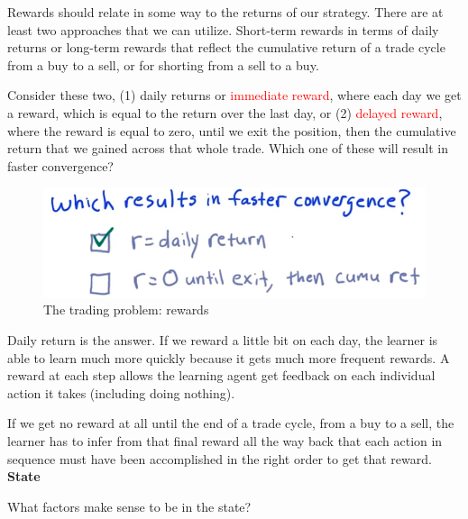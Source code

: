 \documentclass[12pt]{article}
\begin{document}
Rewards should relate in some way to the returns of our strategy. There are at least two approaches that we can utilize. Short-term rewards in terms of daily returns or long-term rewards that reflect the cumulative return of a trade cycle from a buy to a sell, or for shorting from a sell to a buy. 

Consider these two, (1) daily returns or \textcolor{red}{immediate reward}, where each day we get a reward, which is equal to the return over the last day, or (2) \textcolor{red}{delayed reward}, where the reward is equal to zero, until we exit the position, then the cumulative return that we gained across that whole trade. Which one of these will result in faster convergence?

\begin{figure}[!ht]
\centering
\includegraphics[scale=0.4]{fig/fig109}
\caption{The trading problem: rewards}
\end{figure}

Daily return is the answer.  If we reward a little bit on each day, the learner is able to learn much more quickly because it gets much more frequent rewards. A reward at each step allows the learning agent get feedback on each individual action it takes (including doing nothing).

If we get no reward at all until the end of a trade cycle, from a buy to a sell, the learner has to infer from that final reward all the way back that each action in sequence must have been accomplished in the right order to get that reward. \\[8pt]
\noindent
\textbf{State}

What factors make sense to be in the state?
\end{document}
